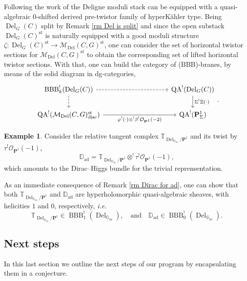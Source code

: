 \documentclass[11pt, a4paper]{amsart}
\numberwithin{equation}{section}
\theoremstyle{definition}
\newtheorem{example}[theorem]{Example}
\theoremstyle{remark}
\DeclareMathOperator{\ad}{ad}
\DeclareMathOperator{\Del}{Del}
\DeclareMathOperator{\QA}{QA}
\DeclareMathOperator{\BBB}{BBB}
\DeclareMathOperator{\st}{st}
\DeclareMathOperator{\discrete}{\mathrm{disc}}
\newcommand{\Mm}{\mathcal{M}}
\newcommand{\Oo}{\mathcal{O}}
\renewcommand{\P}{\mathbf{P}}
\newcommand{\DD}{\mathbb{D}}
\newcommand{\GG}{\mathbb{G}}
\newcommand{\TT}{\mathbb{T}}
\renewcommand{\to}{\longrightarrow}
\begin{document}
Following the work of \cite{kryczka&tannaka&yau} the Deligne moduli stack can be equipped with a quasi-algebraic $0$-shifted derived pre-twistor family of hyperKähler type. Being $\Del_G(C)$ split by Remark \ref{rm Del is split} and since the open substack $\Del_G(C)^{\st}$ is naturally equipped with a good moduli structure $\zeta: \Del_G(C)^{\st} \to \Mm_{\Del}(C,G)^{\st}$, one can consider the set of horizontal twistor sections for $\Mm_{\Del}(C,G)^{\st}$ to obtain the corresponding set of lifted horizontal twistor sections. With that, one can build the category of (BBB)-branes, by means of the solid diagram in dg-categories,
\begin{equation} \label{eq solid diagram for Del}
    \begin{tikzcd}
	{\BBB^!_k(\Del_G(C))} & & & & 
    {\QA^!(\Del_G(C))} \\
	{\QA^!(\Mm_{\Del}(C,G)^{\st}_{\discrete})} & & & & {\QA^!(\P^1_{\Sigma})}
	\arrow[dashed, from=1-1, to=1-5]
	\arrow[dashed, from=1-1, to=2-1]
	\arrow["{\Sigma^! \Xi (\cdot)}", from=1-5, to=2-5]
	\arrow["{\varphi^!(\cdot) \otimes^! \beta^!\Oo_{\P^1}(-2)}"', from=2-1, to=2-5]
\end{tikzcd}.
\end{equation}




\begin{example}
Consider the relative tangent complex $\TT_{\Del_{\GG_m}/\P^1}$ and its twist by $\tau^! \Oo_{\P^1}(-1)$,  
\[
\DD_{\ad} = \TT_{\Del_{\GG_m}/\P^1} \otimes^! \tau^! \Oo_{\P^1}(-1),
\]
which amounts to the Dirac--Higgs bundle for the trivial reprensentation.

As an immediate consequence of Remark \ref{rm Dirac for ad}, one can show that both $\TT_{\Del_{\GG_m}/\P^1}$ and $\DD_{\ad}$ are hyperholomorphic quasi-algebraic sheaves, with helicities $1$ and $0$, respectively, {\it i.e.}
\[
\TT_{\Del_{\GG_m}/\P^1} \in \BBB^!_1(\Del_{\GG_m}), \quad \text{and} \quad \DD_{\ad} \in \BBB^!_0(\Del_{\GG_m}).
\]
\end{example}




\subsection{Next steps} \label{subsect next steps}

In this last section we outline the next steps of our program by encapsulating them in a conjecture. %
\end{document}
